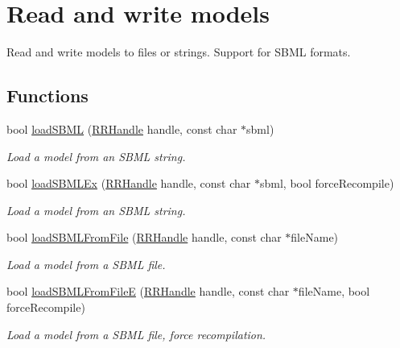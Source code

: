 \hypertarget{group__loadsave}{\section{Read and write models}
\label{group__loadsave}
}


Read and write models to files or strings. Support for S\+B\+M\+L formats.  


\subsection*{Functions}
\begin{DoxyCompactItemize}
\item 
bool \hyperlink{group__loadsave_gafb3515fd8472da389f5f24530017f037}{load\+S\+B\+M\+L} (\hyperlink{rrc__types_8h_a1d68f0592372208fa5a5f2799ea4b3ae}{R\+R\+Handle} handle, const char $\ast$sbml)
\begin{DoxyCompactList}\small\item\em Load a model from an S\+B\+M\+L string. \end{DoxyCompactList}\item 
bool \hyperlink{group__loadsave_ga80ede4ecc6e4e697e289d187c1a8d844}{load\+S\+B\+M\+L\+Ex} (\hyperlink{rrc__types_8h_a1d68f0592372208fa5a5f2799ea4b3ae}{R\+R\+Handle} handle, const char $\ast$sbml, bool force\+Recompile)
\begin{DoxyCompactList}\small\item\em Load a model from an S\+B\+M\+L string. \end{DoxyCompactList}\item 
bool \hyperlink{group__loadsave_ga275b8f8d7350505c383fdc9634713041}{load\+S\+B\+M\+L\+From\+File} (\hyperlink{rrc__types_8h_a1d68f0592372208fa5a5f2799ea4b3ae}{R\+R\+Handle} handle, const char $\ast$file\+Name)
\begin{DoxyCompactList}\small\item\em Load a model from a S\+B\+M\+L file. \end{DoxyCompactList}\item 
bool \hyperlink{group__loadsave_gaba8e934b2e2c045312686c5e857aacab}{load\+S\+B\+M\+L\+From\+File\+E} (\hyperlink{rrc__types_8h_a1d68f0592372208fa5a5f2799ea4b3ae}{R\+R\+Handle} handle, const char $\ast$file\+Name, bool force\+Recompile)
\begin{DoxyCompactList}\small\item\em Load a model from a S\+B\+M\+L file, force recompilation. \end{DoxyCompactList}\item 

\end{DoxyCompactItemize}
